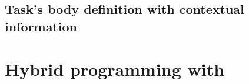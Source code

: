 \subsection{Task's body definition with contextual information}


\section{Hybrid programming with \kaapi}



